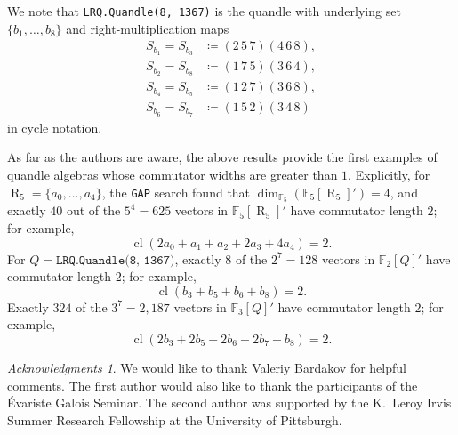 \documentclass[12 pt]{amsart}
\theoremstyle{definition}
\theoremstyle{remark}
\newtheorem*{ack}{Acknowledgments}
\numberwithin{equation}{section}
\newcommand{\cl}{\operatorname{cl}}
\newcommand{\R}{\operatorname{R}}
\newcommand{\F}{\mathbb F}
\begin{document}
We note that \texttt{LRQ.Quandle(8, 1367)} is the quandle with underlying set $\{b_1,\dots,b_8\}$ and right-multiplication maps
\begin{align*}
    S_{b_1}=S_{b_3}&\coloneq(2\,5\,7)(4\,6\,8),\\
    S_{b_2}=S_{b_8}&\coloneq(1\,7\,5)(3\,6\,4),\\
    S_{b_4}=S_{b_5}&\coloneq(1\,2\,7)(3\,6\,8),\\
    S_{b_6}=S_{b_7}&\coloneq(1\,5\,2)(3\,4\,8)
\end{align*}
in cycle notation.

As far as the authors are aware, the above results provide the first examples of quandle algebras whose commutator widths are greater than $1$. Explicitly, for $\R_5=\{a_0,\dots,a_4\}$, the \texttt{GAP} search found that $\dim_{\F_5}(\F_5[\R_5]')=4$, and exactly $40$ out of the $5^4=625$ vectors in $\F_5[\R_5]'$ have commutator length $2$; for example,
\[
\cl(2a_0+a_1+a_2+2a_3+4a_4)=2.
\]
For $Q=\texttt{LRQ.Quandle(8, 1367)}$, exactly $8$ of the $2^7=128$ vectors in $\F_2[Q]'$ have commutator length $2$; for example,
\[
\cl(b_3+b_5+b_6+b_8)=2.
\]
Exactly $324$ of the $3^7=2{,}187$ vectors in $\F_3[Q]'$ have commutator length $2$; for example,
\[
\cl(2b_3+2b_5+2b_6+2b_7+b_8)=2.
\]




\begin{ack}
  We would like to thank Valeriy Bardakov for helpful comments. The first author would also like to thank the participants of the \'Evariste Galois Seminar. The second author was supported by the K.\ Leroy Irvis Summer Research Fellowship at the University of Pittsburgh.
\end{ack}
\end{document}
